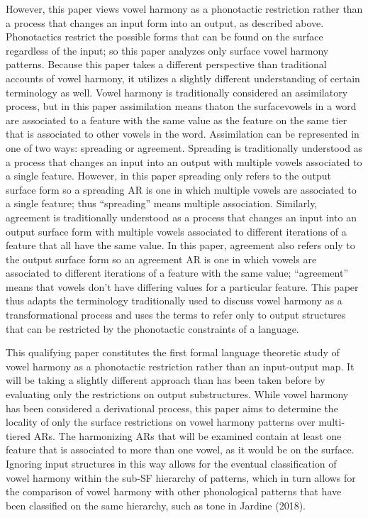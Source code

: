 \documentclass[,doc,floatsintext]{apa6}
\theoremstyle{definition}
\theoremstyle{definition}
\theoremstyle{definition}
\theoremstyle{remark}
\begin{document}
However, this paper views vowel harmony as a phonotactic restriction
rather than a process that changes an input form into an output, as
described above. Phonotactics restrict the possible forms that can be
found on the surface regardless of the input; so this paper analyzes
only surface vowel harmony patterns. Because this paper takes a
different perspective than traditional accounts of vowel harmony, it
utilizes a slightly different understanding of certain terminology as
well. Vowel harmony is traditionally considered an assimilatory process,
but in this paper assimilation means that\textemdash on the
surface\textemdash vowels in a word are associated to a feature with the
same value as the feature on the same tier that is associated to other
vowels in the word. Assimilation can be represented in one of two ways:
spreading or agreement. Spreading is traditionally understood as a
process that changes an input into an output with multiple vowels
associated to a single feature. However, in this paper spreading only
refers to the output surface form so a spreading AR is one in which
multiple vowels are associated to a single feature; thus
\enquote{spreading} means multiple association. Similarly, agreement is
traditionally understood as a process that changes an input into an
output surface form with multiple vowels associated to different
iterations of a feature that all have the same value. In this paper,
agreement also refers only to the output surface form so an agreement AR
is one in which vowels are associated to different iterations of a
feature with the same value; \enquote{agreement} means that vowels don't
have differing values for a particular feature. This paper thus adapts
the terminology traditionally used to discuss vowel harmony as a
transformational process and uses the terms to refer only to output
structures that can be restricted by the phonotactic constraints of a
language.

This qualifying paper constitutes the first formal language theoretic
study of vowel harmony as a phonotactic restriction rather than an
input-output map. It will be taking a slightly different approach than
has been taken before by evaluating only the restrictions on output
substructures. While vowel harmony has been considered a derivational
process, this paper aims to determine the locality of only the surface
restrictions on vowel harmony patterns over multi-tiered ARs. The
harmonizing ARs that will be examined contain at least one feature that
is associated to more than one vowel, as it would be on the surface.
Ignoring input structures in this way allows for the eventual
classification of vowel harmony within the sub-SF hierarchy of patterns,
which in turn allows for the comparison of vowel harmony with other
phonological patterns that have been classified on the same hierarchy,
such as tone in Jardine (2018).
\end{document}
